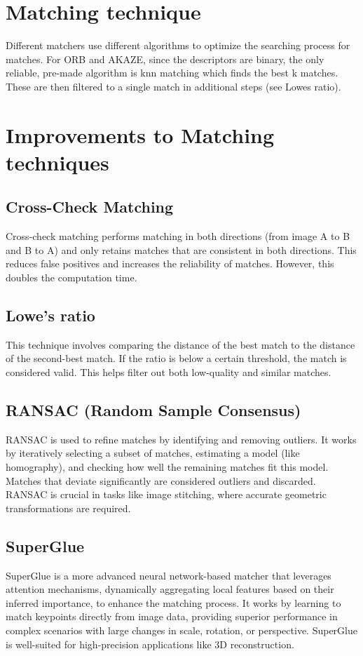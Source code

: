 \section*{Matching technique}
Different matchers use different algorithms to optimize the searching process for matches. For ORB and AKAZE, since the descriptors are binary, the only reliable, pre-made algorithm is knn matching which finds the best k matches. These are then filtered to a single match in additional steps (see Lowes ratio). 

\section*{Improvements to Matching techniques}
\subsection*{Cross-Check Matching} Cross-check matching performs matching in both directions (from image A to B and B to A) and only retains matches that are consistent in both directions. This reduces false positives and increases the reliability of matches. However, this doubles the computation time.

\subsection*{Lowe's ratio}
This technique involves comparing the distance of the best match to the distance of the second-best match. If the ratio is below a certain threshold, the match is considered valid. This helps filter out both low-quality and similar matches. 

\subsection*{RANSAC (Random Sample Consensus)} RANSAC is used to refine matches by identifying and removing outliers. It works by iteratively selecting a subset of matches, estimating a model (like homography), and checking how well the remaining matches fit this model. Matches that deviate significantly are considered outliers and discarded. RANSAC is crucial in tasks like image stitching, where accurate geometric transformations are required.


\subsection*{SuperGlue} SuperGlue is a more advanced neural network-based matcher that leverages attention mechanisms, dynamically aggregating local features based on their inferred importance, to enhance the matching process. It works by learning to match keypoints directly from image data, providing superior performance in complex scenarios with large changes in scale, rotation, or perspective. SuperGlue is well-suited for high-precision applications like 3D reconstruction. 
